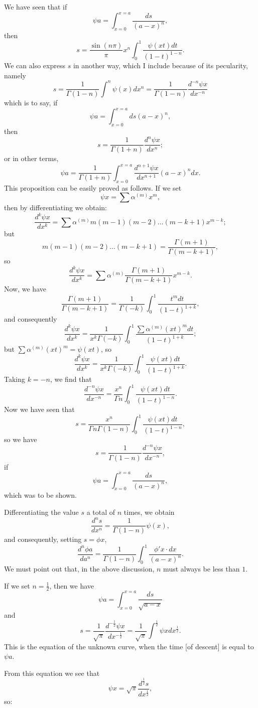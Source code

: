 \documentclass[12pt]{article}
\begin{document}
We have seen that if 
\[ \psi a = \int_{x=0}^{x=a} \frac{ds}{(a-x)^n} , \]
then 
\[ s = \frac{\sin(n\pi)}{\pi} x^n \int_0^1 \frac{\psi(xt)dt}{(1-t)^{1-n}} .\]
We can also express $s$ in another way, which I include because of its pecularity, namely
\[ s = \frac{1}{\Gamma(1-n)}\int^n \psi(x) dx^n = \frac{1}{\Gamma(1-n)} \frac{d^{-n} \psi x}{dx^{-n} }\]
which is to say, if
\[ \psi a = \int_{x=0}^{x=a} ds (a-x)^n, \]
then
\[ s = \frac{1}{\Gamma(1+n)} \frac{d^n\psi x}{dx^n} ; \]
or in other terms,  
\[ \psi a = \frac{1}{\Gamma(1+n)} \int_{x=0}^{x=a} \frac{d^{n+1}\psi x}{dx^{n+1}} (a-x)^n dx .\]
This proposition can be easily proved as follows. If we set 
\[ \psi x = \sum \alpha^{(m)} x^m, \]
then by differentiating we obtain:
\[ \frac{d^k\psi x}{dx^k} = \sum \alpha^{(m)} m(m-1)(m-2)\dots(m-k+1)x^{m-k} ;\]
but 
\[ m(m-1)(m-2)\dots(m-k+1) = \frac{\Gamma(m+1)}{\Gamma(m-k+1)}, \]
so
\[ \frac{d^k \psi x}{dx^k} = \sum \alpha^{(m)} \frac{\Gamma(m+1)}{\Gamma(m-k+1)} x^{m-k} .\]
Now, we have 
\[ \frac{\Gamma(m+1)}{\Gamma(m-k+1)} = \frac{1}{\Gamma(-k)} \int_0^1 \frac{t^mdt}{(1-t)^{1+k}} ,\]
and consequently
\[ \frac{d^k\psi x}{dx^k} = \frac{1}{x^k \Gamma(-k)} \int_0^1 \frac{\sum \alpha^{(m)} (xt)^m dt}{(1- t)^{1+k}} ; \]
but $\sum \alpha^{(m)}(xt)^m = \psi(xt)$, so
\[ \frac{d^k\psi x}{dx^k} = \frac{1}{x^k\Gamma(-k)} \int_0^1\frac{\psi(xt)dt}{(1-t)^{1+k} }. \]
Taking $k = -n$, we find that
\[ \frac{d^{-n}\psi x}{dx^{-n}} = \frac{x^n}{\Gamma n} \int_0^1 \frac{\psi(xt)dt}{(1-t)^{1-n}}. \]
Now we have seen that 
\[ s = \frac{x^n}{\Gamma n \Gamma(1-n)} \int_0^1\frac{\psi(xt)dt}{(1-t)^{1-n}} , \]
so we have 
\[ s = \frac{1}{\Gamma(1-n)} \frac{d^{-n} \psi x}{dx^{-n}} ,\]
if  
\[ \psi a = \int_{x=0}^{x=a} \frac{ds}{(a-x)^n},\]
which was to be shown.

Differentiating the value $s$ a total of $n$ times, we obtain
\[ \frac{d^n s}{dx^n} = \frac{1}{\Gamma(1-n)} \psi(x), \]
and consequently, setting $s = \phi x$,
\[ \frac{d^n \phi a}{da^n} = \frac{1}{\Gamma(1-n)} \int_0^1 \frac{\phi' x \cdot dx}{(a-x)^n} .\]
We must point out that, in the above discussion, $n$ must always be less than $1$.

If we set $n = \frac{1}{2}$, then we have
\[ \psi a = \int_{x=0}^{x=a} \frac{ds}{\sqrt{a-x}} \]
and
\[ s = \frac{1}{\sqrt{\pi}} \frac{d^{-\frac{1}{2}} \psi x}{dx^{-\frac{1}{2}}} = \frac{1}{\sqrt{\pi}} \int^{\frac{1}{2}} \psi x dx^{\frac{1}{2}}  . \] 
This is the equation of the unknown curve, when the time [of descent] is equal to $\psi a$. 

From this equation we see that 
\[ \psi x = \sqrt{\pi} \frac{d^{\frac{1}{2}} s}{dx^{\frac{1}{2}}}, \]
so:
\end{document}
